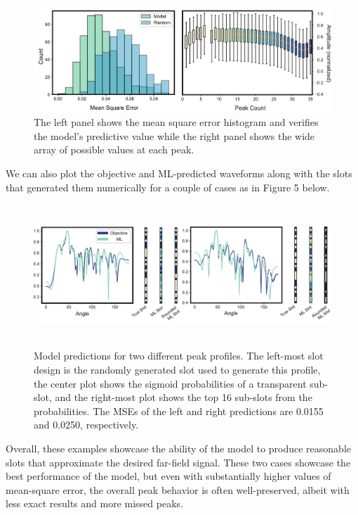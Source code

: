 \documentclass[11pt]{article}
\begin{document}
\begin{figure}[H]
	\includegraphics[width=6.5in]{figures/fig6apdf}
		\caption{The left panel shows the mean square error histogram and verifies the model's predictive value while the right panel shows the wide array of possible values at each peak.}
\end{figure}

\noindent We can also plot the objective and ML-predicted waveforms along with the slots that generated them numerically for a couple of cases as in Figure 5 below.


\begin{figure}[H]
	\centering
	\includegraphics[height=2.1in]{figures/fig7pdf}
	\caption{Model predictions for two different peak profiles. The left-most slot design is the randomly generated slot used to generate this profile, the center plot shows the sigmoid probabilities of a transparent sub-slot, and the right-most plot shows the top 16 sub-slots from the probabilities. The MSEs of the left and right predictions are 0.0155 and 0.0250, respectively.}
\end{figure}

\noindent Overall, these examples showcase the ability of the model to produce reasonable slots that approximate the desired far-field signal. These two cases showcase the best performance of the model, but even with substantially higher values of mean-square error, the overall peak behavior is often well-preserved, albeit with less exact results and more missed peaks.  \\
\end{document}
